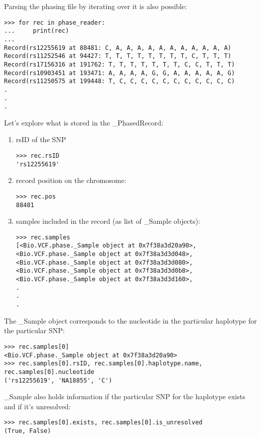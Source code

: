 \noindent Parsing the phasing file by iterating over it is also possible:

\begin{verbatim}
>>> for rec in phase_reader:
...     print(rec)
...
Record(rs12255619 at 88481: C, A, A, A, A, A, A, A, A, A, A, A)
Record(rs11252546 at 94427: T, T, T, T, T, T, T, T, C, T, T, T)
Record(rs17156316 at 191762: T, T, T, T, T, T, T, C, C, T, T, T)
Record(rs10903451 at 193471: A, A, A, A, G, G, A, A, A, A, A, G)
Record(rs11250575 at 199448: T, C, C, C, C, C, C, C, C, C, C, C)
.
.
.

\end{verbatim}

\noindent Let's explore what is stored in the \_PhasedRecord:
\begin{enumerate}
\item rsID of the SNP
\begin{verbatim}
>>> rec.rsID
'rs12255619'
\end{verbatim}

\item record position on the chromosome:
\begin{verbatim}
>>> rec.pos
88481
\end{verbatim}

\item samples included in the record (as list of \_Sample objects):
\begin{verbatim}
>>> rec.samples
[<Bio.VCF.phase._Sample object at 0x7f38a3d20a90>,
<Bio.VCF.phase._Sample object at 0x7f38a3d3d048>,
<Bio.VCF.phase._Sample object at 0x7f38a3d3d080>,
<Bio.VCF.phase._Sample object at 0x7f38a3d3d0b8>,
<Bio.VCF.phase._Sample object at 0x7f38a3d3d160>,
.
.
.
\end{verbatim}
\end{enumerate}

\noindent The \_Sample object corresponds to the nucleotide in the particular haplotype for the particular SNP:

\begin{verbatim}
>>> rec.samples[0]
<Bio.VCF.phase._Sample object at 0x7f38a3d20a90>
>>> rec.samples[0].rsID, rec.samples[0].haplotype.name, rec.samples[0].nucleotide
('rs12255619', 'NA18855', 'C')
\end{verbatim}

\noindent \_Sample also holds information if the particular SNP for the haplotype exists and if it's unresolved:

\begin{verbatim}
>>> rec.samples[0].exists, rec.samples[0].is_unresolved
(True, False)
\end{verbatim}

